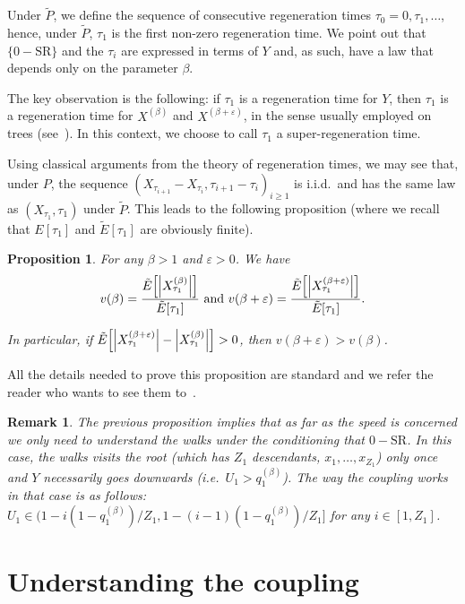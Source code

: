 \documentclass[12pt]{amsart}
\numberwithin{equation}{section}
\newtheorem{proposition}{Proposition}[section]
\newtheorem{remark}{Remark}[section]
\begin{document}
Under $\tilde{P}$, we define the sequence of consecutive regeneration times $\tau_0=0,\tau_1,\ldots$, hence, under $\tilde{P}$, $\tau_1$ is the first non-zero regeneration time. We point out that $\{0-\text{SR}\}$ and the $\tau_i$ are expressed in terms of $Y$ and, as such, have a law that depends only on the parameter $\beta$.

The key observation is the following: if $\tau_1$ is a regeneration time for $Y$, then $\tau_1$ is a regeneration time for $X^{(\beta)}$ and $X^{(\beta+{\varepsilon})}$, in the sense usually employed on trees (see~\cite{LPP}). In this context, we choose to call $\tau_1$  a super-regeneration time.

Using classical arguments from the theory of regeneration times, we may see that, under $P$, the sequence $(X_{\tau_{i+1}}-X_{\tau_i},\tau_{i+1}-\tau_i)_{i\geq 1}$ is i.i.d.~and has the same law as $(X_{\tau_1},\tau_1)$ under $\tilde{P}$.  This leads to the following proposition (where we recall that $E[\tau_1]$ and $\tilde{E}[\tau_1]$ are obviously finite). 
\begin{proposition}
\label{prop_speed1}
For any $\beta>1$ and ${\varepsilon}>0$. We have 
\[
v(\beta)=\frac{\tilde{E}\Bigl[{\left\vert {X_{\tau_1}^{(\beta)}}\right\vert}\Bigr]}{\tilde{E}[\tau_1]} \text{ and } v(\beta+{\varepsilon})=\frac{\tilde{E}\Bigl[{\left\vert {X_{\tau_1}^{(\beta+{\varepsilon})}}\right\vert}\Bigr]}{\tilde{E}[\tau_1]}.
\]

In particular, if $\tilde{E}\Bigl[{\left\vert {X_{\tau_1}^{(\beta+{\varepsilon})}}\right\vert}-{\left\vert {X_{\tau_1}^{(\beta)}}\right\vert}\Bigr]>0$, then $v(\beta+{\varepsilon})>v(\beta)$.
\end{proposition}

All the details needed to prove this proposition are standard and we refer the reader who wants to see them to~\cite{LPP}.

\begin{remark} \label{rem_root}
The previous proposition implies that as far as the speed is concerned we only need to understand the walks under the conditioning that $0-\text{SR}$. In this case, the walks visits the root (which has $Z_1$ descendants, $x_1,\ldots, x_{Z_1}$) only once and $Y$ necessarily goes downwards (i.e.~$U_1> q_1^{(\beta)}$). The way the coupling works in that case is as follows: $U_{1}\in (1-i (1-q_1^{(\beta)})/Z_1,1-(i-1) (1-q_1^{(\beta)})/Z_1]$ for any $i\in [1,Z_1]$.
\end{remark}

\section{Understanding the coupling}
\end{document}
